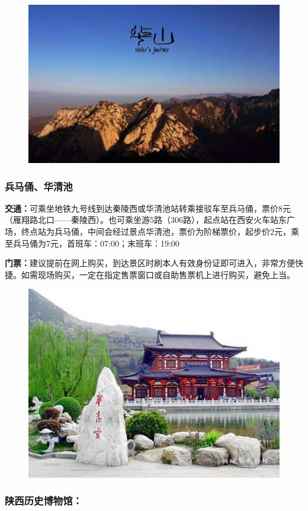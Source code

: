 \documentclass[
decoration,  %
]{qyxf-book}
\begin{document}
\begin{figure}[htbp]
	\centering
	\includegraphics[width=0.8\linewidth]{pics/image25.jpg}
\end{figure}

\subsubsection{兵马俑、华清池}

\textbf{交通：}可乘坐地铁九号线到达秦陵西或华清池站转乘接驳车至兵马俑，票价8元（雁翔路北口——秦陵西）。也可乘坐游5路（306路），起点站在西安火车站东广场，终点站为兵马俑，中间会经过景点华清池，票价为阶梯票价，起步价2元，乘至兵马俑为7元，首班车：07:00；末班车：19:00

\textbf{门票：}建议提前在网上购买，到达景区时刷本人有效身份证即可进入，非常方便快捷。如需现场购买，一定在指定售票窗口或自助售票机上进行购买，避免上当。

\begin{figure}[htbp]
	\centering
	\includegraphics[width=0.8\linewidth]{pics/image26.jpg}
\end{figure}


\subsubsection{陕西历史博物馆：}
\end{document}
